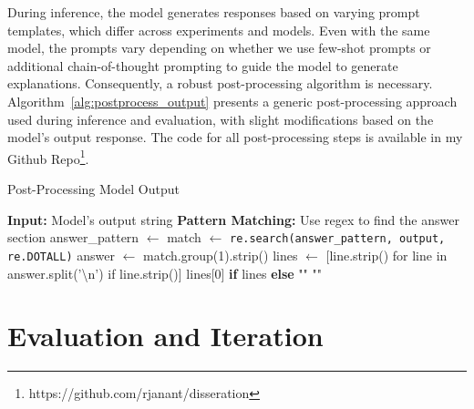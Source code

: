 \documentclass[logo,msc]{infthesis}           %
\begin{document}
During inference, the model generates responses based on varying prompt templates, which differ across experiments and models. Even with the same model, the prompts vary depending on whether we use few-shot prompts or additional chain-of-thought prompting to guide the model to generate explanations. Consequently, a robust post-processing algorithm is necessary. Algorithm~\ref{alg:postprocess_output} presents a generic post-processing approach used during inference and evaluation, with slight modifications based on the model's output response. The code for all post-processing steps is available in my Github Repo\footnote{https://github.com/rjanant/disseration}.
\begin{algorithm}
\caption{Post-Processing Model Output}
\label{alg:postprocess_output}
\begin{algorithmic}[1]
    \State \textbf{Input:} Model's output string
    \State \textbf{Pattern Matching:} Use regex to find the answer section
    \State answer\_pattern $\gets$ 
    \State {}
    \State {}
    \State match $\gets$ \texttt{re.search(answer\_pattern, output, re.DOTALL)}
        \State answer $\gets$ match.group(1).strip()
        \State lines $\gets$ [line.strip() for line in answer.split('\textbackslash n') if line.strip()]
        \State \Return lines[0] \textbf{if} lines \textbf{else} ""
    \Else
        \State \Return ""
    \EndIf
\EndFunction
\end{algorithmic}
\end{algorithm}

\section{Evaluation and Iteration}
\end{document}
